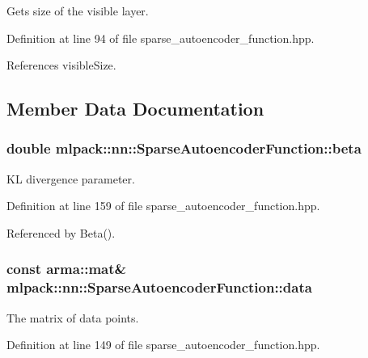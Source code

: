 Gets size of the visible layer. 



Definition at line 94 of file sparse\+\_\+autoencoder\+\_\+function.\+hpp.



References visible\+Size.



\subsection{Member Data Documentation}
\subsubsection[{beta}]{\setlength{\rightskip}{0pt plus 5cm}double mlpack\+::nn\+::\+Sparse\+Autoencoder\+Function\+::beta\hspace{0.3cm}{\ttfamily [private]}}\label{classmlpack_1_1nn_1_1SparseAutoencoderFunction_a3f3dde80bd9f6d86b131de5c7b8873a8}


KL divergence parameter. 



Definition at line 159 of file sparse\+\_\+autoencoder\+\_\+function.\+hpp.



Referenced by Beta().

\subsubsection[{data}]{\setlength{\rightskip}{0pt plus 5cm}const arma\+::mat\& mlpack\+::nn\+::\+Sparse\+Autoencoder\+Function\+::data\hspace{0.3cm}{\ttfamily [private]}}\label{classmlpack_1_1nn_1_1SparseAutoencoderFunction_a92c4fa02c4f73458da18997ae99bb266}


The matrix of data points. 



Definition at line 149 of file sparse\+\_\+autoencoder\+\_\+function.\+hpp.

